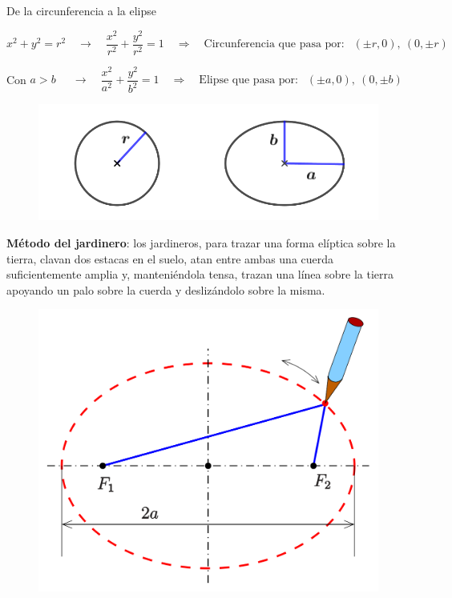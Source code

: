 \vspace{7mm}
\begin{myexampleblock}{De la circunferencia a la elipse}

\vspace{1mm} $x^2+y^2=r^2 \quad\to \quad \dfrac{x^2}{r^2}+\dfrac{y^2}{r^2}=1 \quad \Rightarrow \quad \text{Circunferencia que pasa por: } \ \ (\pm r,0),\ (0,\pm r)$	

\vspace{3mm} Con $a>b \quad \ \ \to \quad \dfrac{x^2}{a^2}+\dfrac{y^2}{b^2}=1 \quad \Rightarrow \quad   \text{Elipse que pasa por: } \ \ (\pm a,0),\ (0,\pm b)$	

\begin{figure}[H]
	\centering
	\includegraphics[width=.6\textwidth]{img-conicas/conicas24.png}
	\end{figure}
	
\textbf{Método del jardinero}: los jardineros, para trazar una forma elíptica sobre la tierra, clavan dos estacas en el suelo, atan entre ambas una cuerda suficientemente amplia y, manteniéndola tensa, trazan una línea sobre la tierra apoyando un palo sobre la cuerda y deslizándolo sobre la misma.

\begin{figure}[H]
	\centering
	\includegraphics[width=.4\textwidth]{img-conicas/conicas27.png}
	\end{figure}
\end{myexampleblock}

\vspace{7mm}


